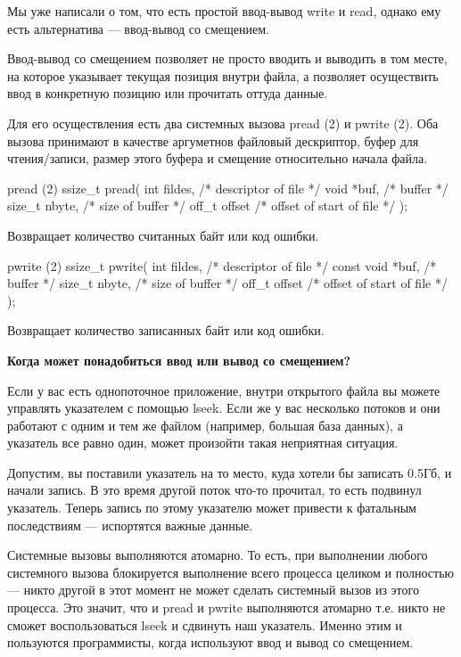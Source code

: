 Мы уже написали о том, что есть простой ввод-вывод write и read, однако ему есть альтернатива --- ввод-вывод со смещением. 

Ввод-вывод со смещением позволяет не просто вводить и выводить в том месте, на которое указывает текущая позиция внутри файла, а позволяет осуществить ввод в конкретную позицию или прочитать оттуда данные.

Для его осуществления есть два системных вызова pread (2) и pwrite (2). Оба вызова принимают в качестве аргуметнов файловый дескриптор, буфер для чтения/записи, размер этого буфера и смещение относительно начала файла.

\begin{CCode}{pread (2)}
	ssize_t pread(
		int fildes, 	/* descriptor of file */
		void *buf,		/* buffer */
		size_t nbyte, 	/* size of buffer  */
		off_t offset	/* offset of start of file */
	); \end{CCode}
Возвращает количество считанных байт или код ошибки.

\begin{CCode}{pwrite (2)}
	ssize_t pwrite(
		int fildes, 		/* descriptor of file */
		const void *buf,	/* buffer */
		size_t nbyte,		/* size of buffer  */
		off_t offset		/* offset of start of file */
	); \end{CCode}
Возвращает количество записанных байт или код ошибки.

\textbf{Когда может понадобиться ввод или вывод со смещением?}

Если у вас есть однопоточное приложение, внутри открытого файла вы можете управлять указателем с помощью lseek. Если же у вас несколько потоков и они работают с одним и тем же файлом (например, большая база данных), а указатель все равно один, может произойти такая неприятная ситуация.

Допустим, вы поставили указатель на то место, куда хотели бы записать 0.5Гб, и начали запись. В это время другой поток что-то прочитал, то есть подвинул указатель. Теперь запись по этому указателю может привести к фатальным последствиям --- испортятся важные данные.

Системные вызовы выполняются атомарно. То есть, при выполнении любого системного вызова блокируется выполнение всего процесса целиком и полностью --- никто другой в этот момент не может сделать системный вызов из этого процесса. Это значит, что и pread и pwrite выполняются атомарно т.е. никто не сможет воспользоваться lseek и сдвинуть наш указатель. Именно этим и пользуются программисты, когда используют ввод и вывод со смещением.
